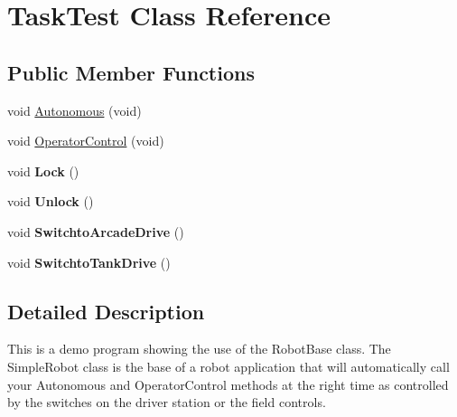 \hypertarget{class_task_test}{\section{Task\-Test Class Reference}
\label{class_task_test}
}
\subsection*{Public Member Functions}
\begin{DoxyCompactItemize}
\item 
void \hyperlink{class_task_test_a8680eee6f9af558b8b94a0328d186217}{Autonomous} (void)
\item 
void \hyperlink{class_task_test_a05a602d8807acb207c86825deab3b9d1}{Operator\-Control} (void)
\item 
\hypertarget{class_task_test_a83b7f12433df44c032fc4a2dac4ddbb6}{void {\bfseries Lock} ()}\label{class_task_test_a83b7f12433df44c032fc4a2dac4ddbb6}

\item 
\hypertarget{class_task_test_aa34bdc5d2ae91c7de1afc4d2dfe7aa48}{void {\bfseries Unlock} ()}\label{class_task_test_aa34bdc5d2ae91c7de1afc4d2dfe7aa48}

\item 
\hypertarget{class_task_test_a0917f09429234595d076ef19a2753935}{void {\bfseries Switchto\-Arcade\-Drive} ()}\label{class_task_test_a0917f09429234595d076ef19a2753935}

\item 
\hypertarget{class_task_test_aab9af5da7a3c000e9678c0a0f40f81ec}{void {\bfseries Switchto\-Tank\-Drive} ()}\label{class_task_test_aab9af5da7a3c000e9678c0a0f40f81ec}

\end{DoxyCompactItemize}


\subsection{Detailed Description}
This is a demo program showing the use of the Robot\-Base class. The Simple\-Robot class is the base of a robot application that will automatically call your Autonomous and Operator\-Control methods at the right time as controlled by the switches on the driver station or the field controls. 

